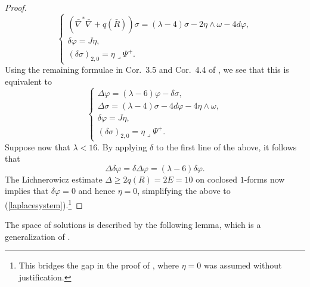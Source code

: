 \documentclass[12pt]{scrartcl}
\theoremstyle{plain}
\theoremstyle{definition}
\newcommand{\Einstein}{E}%
\begin{document}
\begin{proof}
\[\begin{cases}
   (\bar\nabla^\ast\bar\nabla+q(\bar R))\sigma=(\lambda-4)\sigma-2\eta\wedge\omega-4d\varphi,\\
   \delta\varphi=J\eta,\\
   (\delta\sigma)_{2,0}=\eta\lrcorner\Psi^+.
  \end{cases}\]
Using the remaining formulae in Cor.~3.5 and Cor.~4.4 of \cite{nearlykaehler}, we see that this is equivalent to
\[\begin{cases}
    \Delta\varphi=(\lambda-6)\varphi-\delta\sigma,\\
    \Delta\sigma=(\lambda-4)\sigma-4d\varphi-4\eta\wedge\omega,\\
   \delta\varphi=J\eta,\\
   (\delta\sigma)_{2,0}=\eta\lrcorner\Psi^+.
\end{cases}\]
Suppose now that $\lambda<16$. By applying $\delta$ to the first line of the above, it follows that
\[\Delta\delta\varphi=\delta\Delta\varphi=(\lambda-6)\delta\varphi.\]
The Lichnerowicz estimate $\Delta\geq 2q(R)=2\Einstein=10$ on coclosed $1$-forms now implies that $\delta\varphi=0$ and hence $\eta=0$, simplifying the above to (\ref{laplacesystem}).\footnote{This bridges the gap in the proof of \cite[Thm.~5.1]{nearlykaehler}, where $\eta=0$ was assumed without justification.}
\end{proof}

The space of solutions is described by the following lemma, which is a generalization of \cite[Lem.~5.2]{nearlykaehler}.
\end{document}
